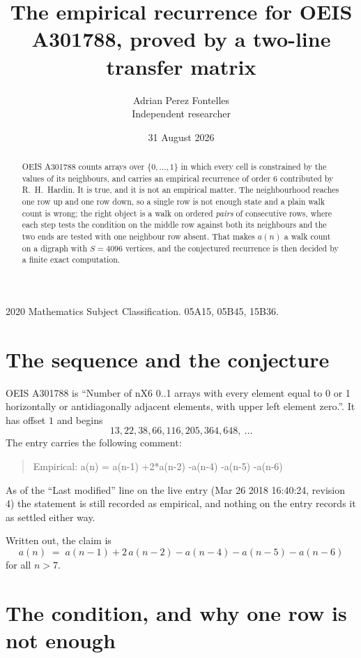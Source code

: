\documentclass[11pt,a4paper]{article}
\title{The empirical recurrence for OEIS A301788, proved by a two-line transfer matrix}
\author{Adrian Perez Fontelles\\ \small Independent researcher}
\date{31 August 2026}
\theoremstyle{plain}
\theoremstyle{definition}
\begin{document}
\maketitle

\begin{abstract}
OEIS A301788 counts arrays over $\{0,\dots,1\}$ in which every cell is constrained by the
values of its neighbours, and carries an empirical recurrence of order $6$ contributed
by R.~H.~Hardin. It is true, and it is not an empirical matter. The neighbourhood reaches one
row up and one row down, so a single row is not enough state and a plain walk count
is wrong; the right object is a walk on ordered \emph{pairs} of consecutive rows, where
each step tests the condition on the middle row against both its neighbours and the two
ends are tested with one neighbour row absent. That makes $a(n)$ a walk count on a digraph
with $S=4096$ vertices, and the conjectured recurrence is then decided by a finite exact
computation.
\end{abstract}

\noindent\small 2020 Mathematics Subject Classification. 05A15, 05B45, 15B36.\normalsize

\section{The sequence and the conjecture}

OEIS A301788 is ``Number of nX6 0..1 arrays with every element equal to 0 or 1 horizontally or antidiagonally adjacent elements, with upper left element zero.''. It has offset $1$ and begins
\[
13, 22, 38, 66, 116, 205, 364, 648,\ \dots
\]
The entry carries the following comment:
\begin{quote}\small
Empirical: a(n) = a(n-1) +2*a(n-2) -a(n-4) -a(n-5) -a(n-6)
\end{quote}
As of the ``Last modified'' line on the live entry (Mar 26 2018 16:40:24, revision 4) the statement is
still recorded as empirical, and nothing on the entry records it as settled either way.

Written out, the claim is
\begin{equation}\label{eq:conj}
a(n)\;=\;a(n-1) + 2\,a(n-2) - a(n-4) - a(n-5) - a(n-6)
\end{equation}
for all $n>7$.

\section{The condition, and why one row is not enough}
\end{document}
